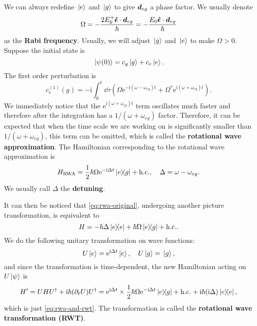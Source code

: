 \documentclass[hyperref, a4paper]{article}
\newcommand*{\ii}{\mathrm{i}}
\newcommand*{\ee}{\mathrm{e}}
\newcommand*{\concept}[1]{{\textbf{#1}}}
\begin{document}
We can always redefine $\ket*{e}$ and $\ket*{g}$ to give $\vb*{d}_{eg}$ a phase factor. We usually denote 
\begin{equation}
    \Omega = - \frac{2 E_0^+ \vu*{\epsilon} \cdot \vb*{d}_{eg}}{\hbar} = - \frac{E_0 \vu*{\epsilon} \cdot \vb*{d}_{eg}}{\hbar}
\end{equation}
as the \concept{Rabi frequency}. Usually, we will adjust $\ket*{g}$ and $\ket*{e}$ to make $\Omega > 0$.
Suppose the initial state is 
\begin{equation}
    \ket*{\psi(0)} = c_{g} \ket*{g} + c_{e} \ket*{e}.
\end{equation}
The first order perturbation is 
\begin{equation}
    c^{(1)}_e(g) = - \ii \int_0^t \dd{\tau} (\Omega \ee^{- \ii (\omega - \omega_{eg}) t} + \Omega^* \ee^{\ii (\omega + \omega_{eg}) t}).
\end{equation}
We immediately notice that the $\ee^{\ii (\omega + \omega_{eg}) t}$ term oscillates much faster and therefore after the integration has a $1 / (\omega + \omega_{eg})$ factor.
Therefore, it can be expected that when the time scale we are working on is significantly smaller than $1 / (\omega + \omega_{eg})$, this term can be omitted, which is called the \concept{rotational wave approximation}.
The Hamiltonian corresponding to the rotational wave approximation is 
\begin{equation}
    H_\text{RWA} = \frac{1}{2} \hbar \Omega \ee^{- \ii \Delta t} \dyad{e}{g} + \text{h.c.}, \quad \Delta = \omega - \omega_{eg}.
    \label{eq:rwa-original}
\end{equation}
We usually call $\Delta$ the \concept{detuning}.

It can then be noticed that \eqref{eq:rwa-original}, undergoing another picture transformation, is equivalent to 
\begin{equation}
    H = - \hbar \Delta \dyad{e} + \hbar \Omega \dyad{e}{g} + \text{h.c.}.
    \label{eq:rwa-and-rwt}
\end{equation}
We do the following unitary transformation on wave functions:
\begin{equation}
    U \ket*{e} = \ee^{\ii \Delta t} \ket*{e}, \quad U \ket*{g} = \ket*{g},
\end{equation} 
and since the transformation is time-dependent, the new Hamiltonian acting on $U \ket*{\psi}$ is 
\[
    H' = U H U^\dagger + \ii \hbar (\partial_t U) U^\dagger = \ee^{\ii \Delta t} \times \frac{1}{2} \hbar \Omega \ee^{- \ii \Delta t} \dyad{e}{g} + \text{h.c.} + \ii \hbar (\ii \Delta) \dyad{e},
\]
which is just \eqref{eq:rwa-and-rwt}. The transformation is called the \concept{rotational wave transformation 
(RWT)}.
\end{document}
